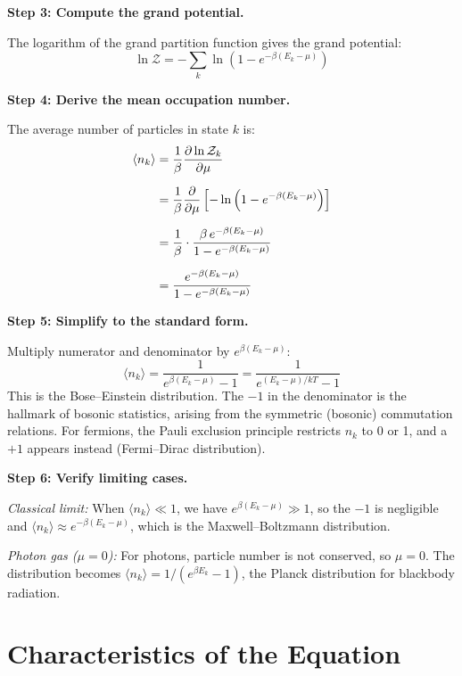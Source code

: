 \documentclass[11pt,openright]{book}
\begin{document}
\textbf{Step 3: Compute the grand potential.}

The logarithm of the grand partition function gives the grand potential:
\begin{equation}
\ln \mathcal{Z} = -\sum_k \ln\left(1 - e^{-\beta(E_k - \mu)}\right)
\end{equation}

\textbf{Step 4: Derive the mean occupation number.}

The average number of particles in state $k$ is:
\begin{align}
\langle n_k \rangle &= \frac{1}{\beta} \frac{\partial \ln \mathcal{Z}_k}{\partial \mu} \notag \\[6pt]
&= \frac{1}{\beta} \frac{\partial}{\partial \mu} \left[-\ln\left(1 - e^{-\beta(E_k - \mu)}\right)\right] \notag \\[6pt]
&= \frac{1}{\beta} \cdot \frac{\beta \, e^{-\beta(E_k - \mu)}}{1 - e^{-\beta(E_k - \mu)}} \notag \\[6pt]
&= \frac{e^{-\beta(E_k - \mu)}}{1 - e^{-\beta(E_k - \mu)}}
\end{align}

\textbf{Step 5: Simplify to the standard form.}

Multiply numerator and denominator by $e^{\beta(E_k - \mu)}$:
\begin{equation}
\boxed{\langle n_k \rangle = \frac{1}{e^{\beta(E_k - \mu)} - 1} = \frac{1}{e^{(E_k - \mu)/kT} - 1}}
\end{equation}
This is the Bose--Einstein distribution. The $-1$ in the denominator is the hallmark of bosonic statistics, arising from the symmetric (bosonic) commutation relations. For fermions, the Pauli exclusion principle restricts $n_k$ to 0 or 1, and a $+1$ appears instead (Fermi--Dirac distribution).

\textbf{Step 6: Verify limiting cases.}

\emph{Classical limit:} When $\langle n_k \rangle \ll 1$, we have $e^{\beta(E_k - \mu)} \gg 1$, so the $-1$ is negligible and $\langle n_k \rangle \approx e^{-\beta(E_k - \mu)}$, which is the Maxwell--Boltzmann distribution.

\emph{Photon gas ($\mu = 0$):} For photons, particle number is not conserved, so $\mu = 0$. The distribution becomes $\langle n_k \rangle = 1/(e^{\beta E_k} - 1)$, the Planck distribution for blackbody radiation.

\section*{Characteristics of the Equation}
\end{document}
